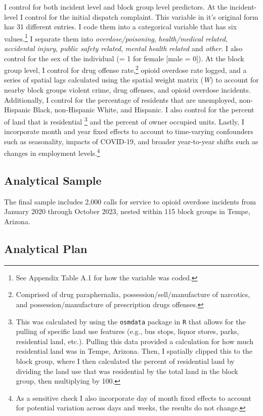 I control for both incident level and block group level predictors. At the incident-level I control for the initial dispatch complaint. This variable in it's original form has 31 different entries. I code them into a categorical variable that has six values.\footnote{See Appendix Table A.1 for how the variable was coded.} I separate them into \textit{overdose/poisoning}, \textit{health/medical related}, \textit{accidental injury}, \textit{public safety related}, \textit{mental health related} and \textit{other}. I also control for the sex of the individual (= 1 for female [male = 0]). At the block group level, I control for drug offense rate,\footnote{Comprised of drug paraphernalia, possession/sell/manufacture of narcotics, and possession/manufacture of prescription drugs offenses.} opioid overdose rate logged, and a series of spatial lags calculated using the spatial weight matrix (\textit{W}) to account for nearby block groups violent crime, drug offenses, and opioid overdose incidents. Additionally, I control for the percentage of residents that are unemployed, non-Hispanic Black, non-Hispanic White, and Hispanic. I also control for the percent of land that is residential \footnote{This was calculated by using the \texttt{osmdata} package in \texttt{R} that allows for the pulling of specific land use features (e.g., bus stops, liquor stores, parks, residential land, etc.). Pulling this data provided a calculation for how much residential land was in Tempe, Arizona. Then, I spatially clipped this to the block group, where I then calculated the percent of residential land by dividing the land use that was residential by the total land in the block group, then multiplying by 100.} and the percent of owner occupied units. Lastly, I incorporate month and year fixed effects to account to time-varying confounders such as seasonality, impacts of COVID-19, and broader year-to-year shifts such as changes in employment levels.\footnote{As a sensitive check I also incorporate day of month fixed effects to account for potential variation across days and weeks, the results do not change.}

\subsection{Analytical Sample}
The final sample includes 2,000 calls for service to opioid overdose incidents from January 2020 through October 2023, nested within 115 block groups in Tempe, Arizona.

\subsection{Analytical Plan}
